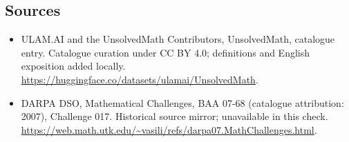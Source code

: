 \documentclass[11pt]{article}
\begin{document}
\subsection{Sources}
\begin{itemize}
\item[\hypertarget{source:statement:1}{S1}] ULAM.AI and the UnsolvedMath Contributors, UnsolvedMath, catalogue entry. Catalogue curation under CC BY 4.0; definitions and English exposition added locally.
\url{https://huggingface.co/datasets/ulamai/UnsolvedMath}.
\item[\hypertarget{source:statement:2}{S2}] DARPA DSO, Mathematical Challenges, BAA 07-68 (catalogue attribution: 2007), Challenge 017. Historical source mirror; unavailable in this check.
\url{https://web.math.utk.edu/~vasili/refs/darpa07.MathChallenges.html}.
\end{itemize}
\label{end:statement}
\end{document}
